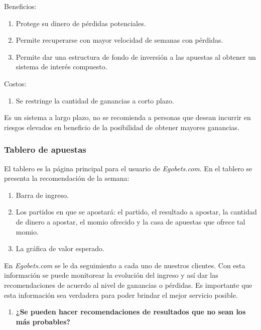 Beneficios:
\begin{enumerate}

	\item Protege su dinero de pérdidas potenciales.
	\item Permite recuperarse con mayor velocidad de semanas con pérdidas.
	\item Permite dar una estructura de fondo de inversión a las apuestas al obtener un sistema de interés compuesto.

\end{enumerate}

Costos:
\begin{enumerate}
	\item Se restringe la cantidad de ganancias a corto plazo.
\end{enumerate}

Es un sistema a largo plazo, no se recomienda a personas que desean incurrir en riesgos elevados en beneficio de la posibilidad de obtener mayores ganancias.


\subsubsection{Tablero de apuestas}

El tablero es la página principal para el usuario de \emph{Egobets.com}. En el tablero se presenta la recomendación de la semana:
\begin{enumerate}

\item Barra de ingreso.
\item Los partidos en que se apostará: el partido, el resultado a apostar, la cantidad de dinero a apostar, el momio ofrecido y la casa de apuestas que ofrece tal momio.
\item La gráfica de valor esperado.
\end{enumerate}

En \emph{Egobets.com} se le da seguimiento a cada uno de nuestros clientes. Con esta información se puede monitorear la evolución del ingreso y así dar las recomendaciones de acuerdo al nivel de ganancias o pérdidas. Es importante que esta información sea verdadera para poder brindar el mejor servicio posible.
\begin{enumerate}

	\item \textbf{¿Se pueden hacer recomendaciones de resultados que no sean los más probables?}
\end{enumerate}


